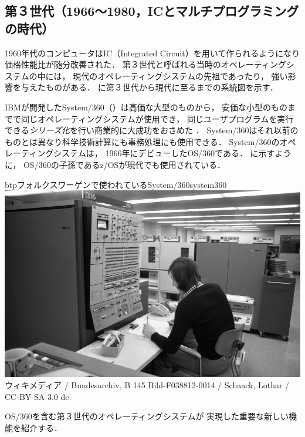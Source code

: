 \subsection{第３世代（1966〜1980，ICとマルチプログラミングの時代）}
1960年代のコンピュータはIC（Integrated Circuit）を用いて作られるようになり
価格性能比が随分改善された．
第３世代と呼ばれる当時のオペレーティングシステムの中には，
現代のオペレーティングシステムの先祖であったり，
強い影響を与えたものがある．
に第３世代から現代に至るまでの系統図を示す．


IBMが開発したSystem/360（）は高価な大型のものから，
安価な小型のものまでで同じオペレーティングシステムが使用でき，
同じユーザプログラムを実行できる\emph{シリーズ化}を行い商業的に大成功をおさめた
\cite{third}．
System/360はそれ以前のものとは異なり科学技術計算にも事務処理にも使用できる．
System/360のオペレーティングシステムは，
1966年にデビューしたOS/360である．
に示すように，
OS/360の子孫であるz/OSが現代でも使用されている\cite{os360}．

\begin{myfig}{btp}{フォルクスワーゲンで使われているSystem/360}{system360}
  \includegraphics[scale=0.25]
  {Photo/Bundesarchiv_B_145_Bild-F038812-0014,_Wolfsburg,_VW_Autowerk.jpg}\\
  {\small
    ウィキメディア /
    Bundesarchiv, B 145 Bild-F038812-0014 /
    Schaack, Lothar / CC-BY-SA 3.0 de}
\end{myfig}

OS/360を含む第３世代のオペレーティングシステムが
実現した重要な新しい機能を紹介する．

